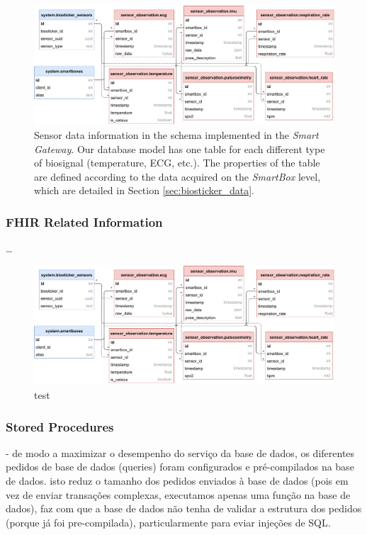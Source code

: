 \begin{figure}[H]
    \centering
    \includegraphics[width=\linewidth]{images/database-schema-sensordata.pdf}
    \caption[Sensor data information in the schema implemented in the \textit{Smart Gateway}.]{
        Sensor data information in the schema implemented in the \textit{Smart Gateway}. Our database model has one table for each different type of biosignal (temperature, \acs{ECG}, etc.). The properties of the table are defined according to the data acquired on the \textit{SmartBox} level, which are detailed in Section \ref{sec:biosticker_data}.}
    \label{fig:wow-dbschema-sensors}
\end{figure}

\subsubsection{FHIR Related Information}
\dots 

\begin{figure}[H]
    \centering
    \includegraphics[width=\linewidth]{images/database-schema-fhir.pdf}
    \caption[test]{test}
    \label{fig:wow-dbschema-fhir}
\end{figure}
 

\subsubsection{Stored Procedures}

- de modo a maximizar o desempenho do serviço da base de dados, os diferentes pedidos de base de dados (queries) foram configurados e pré-compilados na base de dados. isto reduz o tamanho dos pedidos enviados à base de dados (pois em vez de enviar transações complexas, executamos apenas uma função na base de dados), faz com que a base de dados não tenha de validar a estrutura dos pedidos (porque já foi pre-compilada), particularmente para eviar injeções de SQL.


